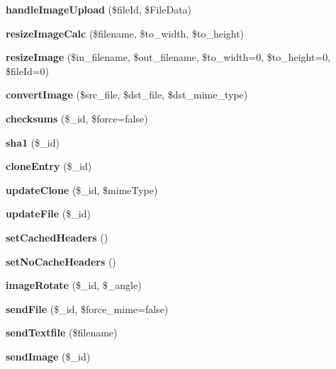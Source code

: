 \begin{CompactItemize}
\item 
{\bf handleImageUpload} (\$fileId, \$FileData)\label{classFiles_e1c08b7115752889c52e6b689e555028}

\item 
{\bf resizeImageCalc} (\$filename, \$to\_\-width, \$to\_\-height)\label{classFiles_83104ff65390c26303c27ac10907f40c}

\item 
{\bf resizeImage} (\$in\_\-filename, \$out\_\-filename, \$to\_\-width=0, \$to\_\-height=0, \$fileId=0)\label{classFiles_ee202bb550a70086ca6dd73d13731b9e}

\item 
{\bf convertImage} (\$src\_\-file, \$dst\_\-file, \$dst\_\-mime\_\-type)\label{classFiles_092f885f0bc251f476bba8029cd3b810}

\item 
{\bf checksums} (\$\_\-id, \$force=false)\label{classFiles_bacdf90ec381437d9a44c950b9a56ec2}

\item 
{\bf sha1} (\$\_\-id)\label{classFiles_a8400f1eeae37215adf027a24f1645c7}

\item 
{\bf cloneEntry} (\$\_\-id)\label{classFiles_9575617628a82a7428d13d8db697605c}

\item 
{\bf updateClone} (\$\_\-id, \$mimeType)\label{classFiles_9e63a796b21153ce133d970c532b69fd}

\item 
{\bf updateFile} (\$\_\-id)\label{classFiles_59836b39f2226ac0004a4f925e248e29}

\item 
{\bf setCachedHeaders} ()\label{classFiles_f4e41ed1366e7b891195fc54c1771253}

\item 
{\bf setNoCacheHeaders} ()\label{classFiles_0a14db6837002f59fd3ca3e4d13b7f01}

\item 
{\bf imageRotate} (\$\_\-id, \$\_\-angle)\label{classFiles_be5412c95a33e95b5185056ec17a7fb3}

\item 
{\bf sendFile} (\$\_\-id, \$force\_\-mime=false)\label{classFiles_9124e66027a01229b7ef15c5ee02ecd8}

\item 
{\bf sendTextfile} (\$filename)\label{classFiles_bfa5b8729aad9784617835d99e86d13c}

\item 
{\bf sendImage} (\$\_\-id)\label{classFiles_1829d90d199f56270c67b5131052e830}


\end{CompactItemize}
